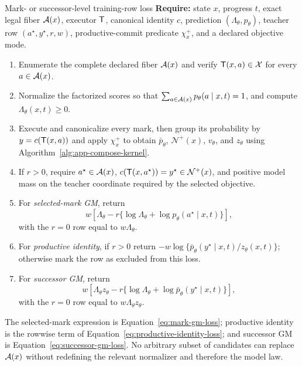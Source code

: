 \begin{composeappendixalgorithm}{Mark- or successor-level training-row loss}
\label{alg:app-compose-training}
\textbf{Require:} state $x$, progress $t$, exact legal fiber $\mathcal{A}(x)$,
executor $\mathsf{T}$, canonical identity $c$, prediction
$(\Lambda_\theta,p_\theta)$, teacher row
$(a^\star,y^\star,r,w)$, productive-commit predicate $\chi_x^+$, and a
declared objective mode.
\begin{enumerate}[
  leftmargin=2.45em,
  label=\arabic*:,
  topsep=0.25em,
  itemsep=0.12em,
  parsep=0pt
]
  \item Enumerate the complete declared fiber $\mathcal{A}(x)$ and verify
  $\mathsf{T}(x,a)\in\mathcal{X}$ for every $a\in\mathcal{A}(x)$.
  \item Normalize the factorized scores so that
  $\sum_{a\in\mathcal{A}(x)}p_\theta(a\mid x,t)=1$, and compute
  $\Lambda_\theta(x,t)\geq0$.
  \item Execute and canonicalize every mark, then group its probability by
  $y=c(\mathsf{T}(x,a))$ and apply $\chi_x^+$ to obtain $\bar p_\theta$,
  $\mathcal N^+(x)$, $v_\theta$, and $z_\theta$ using
  Algorithm~\ref{alg:app-compose-kernel}.
  \item If $r>0$, require $a^\star\in\mathcal{A}(x)$,
  $c(\mathsf{T}(x,a^\star))=y^\star\in\mathcal N^+(x)$, and positive model mass
  on the teacher coordinate required by the selected objective.
  \item For \emph{selected-mark GM}, return
  \[
    w\!\left[
      \Lambda_\theta
      -r\{\log\Lambda_\theta+\log p_\theta(a^\star\mid x,t)\}
    \right],
  \]
  with the $r=0$ row equal to $w\Lambda_\theta$.
  \item For \emph{productive identity}, if $r>0$ return
  $-w\log\{\bar p_\theta(y^\star\mid x,t)/z_\theta(x,t)\}$; otherwise
  mark the row as excluded from this loss.
  \item For \emph{successor GM}, return
  \[
    w\!\left[
      \Lambda_\theta z_\theta
      -r\{\log\Lambda_\theta+\log\bar p_\theta(y^\star\mid x,t)\}
    \right],
  \]
  with the $r=0$ row equal to
  $w\Lambda_\theta z_\theta$.
\end{enumerate}
\end{composeappendixalgorithm}

The selected-mark expression is
Equation~\eqref{eq:mark-gm-loss}; productive identity is the rowwise term of
Equation~\eqref{eq:productive-identity-loss}; and successor GM is
Equation~\eqref{eq:successor-gm-loss}.  No arbitrary subset of candidates can
replace $\mathcal{A}(x)$ without redefining the relevant normalizer and therefore the
model law.

